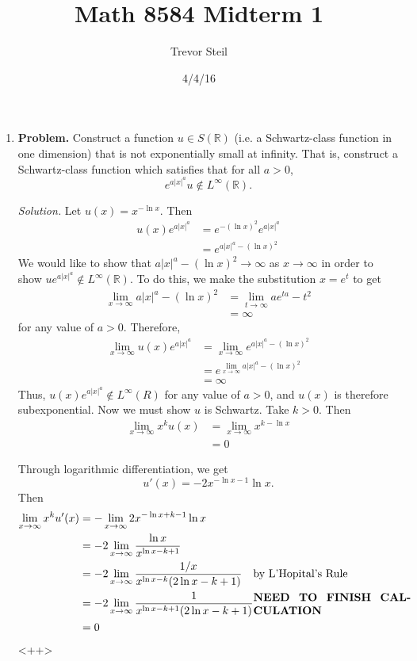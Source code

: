 \documentclass[a4paper]{article}
\title{Math 8584 Midterm 1 }
\date{4/4/16}
\author{Trevor Steil}
\newenvironment{solution}{\emph{Solution.}}{}
\newenvironment{problem}{\textbf{Problem.}}{}
\newcommand{\R}{\mathbb{R}}
\begin{document}
\maketitle

\begin{enumerate}
  \item
    \begin{problem}
      Construct a function $u \in S(\R)$ (i.e. a Schwartz-class function in one dimension) that is not exponentially small at infinity.
      That is, construct a Schwartz-class function which satisfies that for all $a > 0$,
      \[ e^{a |x|^a} u \not \in L^\infty(\R) .\]
    \end{problem}

    \begin{solution}
      Let $u(x) = x^{- \ln x}$. Then
      \begin{align*}
        u(x) e^{a |x|^a} &= e^{-(\ln x)^2} e^{a |x|^a} \\
        &= e^{a |x|^a - (\ln x)^2}
      \end{align*}
      We would like to show that $a |x|^a - (\ln x)^2 \to \infty$ as $x \to \infty$ in order to show $u e^{a |x|^a} \not\in L^\infty(\R)$.
      To do this, we make the substitution $x = e^t$ to get
      \begin{align*}
        \lim_{x \to \infty} a |x|^a - (\ln x)^2 &= \lim_{t \to \infty} a e^{ta} - t^2 \\
        &= \infty
      \end{align*}
      for any value of $a > 0$. Therefore,
      \begin{align*}
        \lim_{x \to \infty} u(x) e^{a |x|^a} &= \lim_{x \to \infty} e^{a |x|^a - (\ln x)^2} \\
        &= e^{ \lim_{x \to \infty}  a|x|^a - (\ln x)^2} \\
        &= \infty
      \end{align*}
      Thus, $u(x) e^{a|x|^a} \not\in L^{\infty}(R)$ for any value of $a > 0$, and $u(x)$ is therefore subexponential. Now we must show $u$ is Schwartz.
      Take $k > 0$. Then
      \begin{align*}
        \lim_{x \to \infty} x^k u(x) &= \lim_{x \to \infty} x^{k - \ln x} \\
        &= 0
      \end{align*}

      Through logarithmic differentiation, we get
      \[ u'(x) = -2 x^{-\ln x - 1} \ln x.\]
      Then
      \begin{align*}
        \lim_{x \to \infty} x^k u'(x) &= - \lim_{x \to \infty} 2 x^{-\ln x + k -1} \ln x \\
        &= -2 \lim_{x \to \infty} \frac{\ln x}{x^{\ln x - k + 1}} \\
        &= -2 \lim_{x \to \infty} \frac{1/x}{x^{\ln x - k}( 2\ln x - k+1)} \quad \parbox{5cm}{by L'Hopital's Rule} \\
        &= -2 \lim_{x \to \infty} \frac{1}{x^{\ln x - k + 1} (2 \ln x - k+1)} \parbox{5cm}{\textbf{NEED TO FINISH CALCULATION}}\\
        &= 0
      \end{align*}<++>
    \end{solution}


\end{enumerate}
\end{document}
